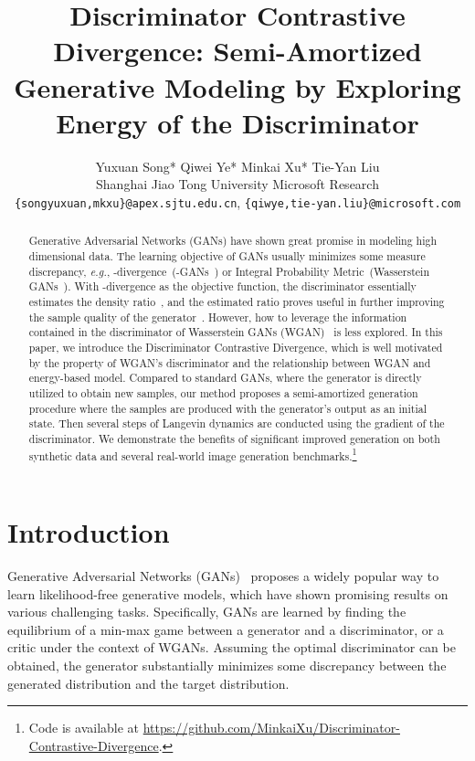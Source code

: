 \documentclass{article}
\title{Discriminator Contrastive Divergence: Semi-Amortized Generative Modeling by Exploring Energy of the Discriminator}
\author{Yuxuan Song*  Qiwei Ye* Minkai Xu* 
  Tie-Yan Liu\\
  Shanghai Jiao Tong University Microsoft Research\\
  \texttt{\{songyuxuan,mkxu\}@apex.sjtu.edu.cn}, \texttt{\{qiwye,tie-yan.liu\}@microsoft.com}
}
\begin{document}
\maketitle

\renewcommand{\thefootnote}{\fnsymbol{footnote}}
\renewcommand{\thefootnote}{\arabic{footnote}}

\begin{abstract}    
    Generative Adversarial Networks (GANs) have shown great promise in modeling high dimensional data. The learning objective of GANs usually minimizes some measure discrepancy, \textit{e.g.}, -divergence~(-GANs~\cite{nowozin2016f}) or Integral Probability Metric~(Wasserstein GANs~\cite{arjovsky2017wasserstein}). With -divergence as the objective function, the discriminator essentially estimates the density ratio~\cite{uehara2016generative}, and the estimated ratio proves useful in further improving the sample quality of the generator~\cite{azadi2018discriminator,turner2018metropolis}. However, how to leverage the information contained in the discriminator of Wasserstein GANs (WGAN)~\cite{arjovsky2017wasserstein} is less explored.  In this paper, we introduce the Discriminator Contrastive Divergence, which is well motivated by the property of WGAN's discriminator and the relationship between WGAN and energy-based model. Compared to standard GANs, where the generator is directly utilized to obtain new samples, our method proposes a semi-amortized generation procedure where the samples are produced with the generator's output as an initial state. Then several steps of Langevin dynamics are conducted using the gradient of the discriminator. We demonstrate the benefits of significant improved generation on both synthetic data and several real-world image generation benchmarks.\footnote{Code is available at \url{https://github.com/MinkaiXu/Discriminator-Contrastive-Divergence}.}
\end{abstract}

\section{Introduction}

Generative Adversarial Networks (GANs)~\cite{goodfellow2014generative} proposes a widely popular way to learn likelihood-free generative models, which have shown promising results on various challenging tasks. Specifically, GANs are learned by finding the equilibrium of a min-max game between a generator and a discriminator, or a critic under the context of WGANs. Assuming the optimal discriminator can be obtained, the generator substantially minimizes some discrepancy between the generated distribution and the target distribution. 
\end{document}
